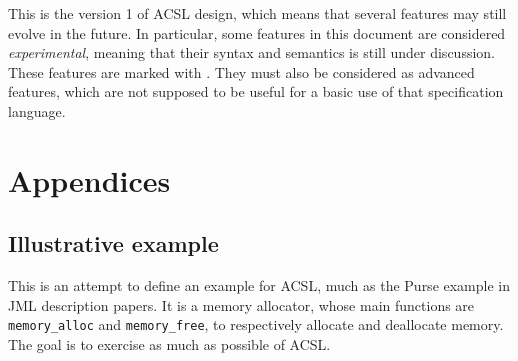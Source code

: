 \documentclass[a4paper,11pt,twoside,openright]{report}
\begin{document}
This is the version 1 of ACSL design, which means that several
features may still evolve in the future. In particular, some features
in this document are considered \emph{experimental}, meaning that
their syntax and semantics is still under discussion.  These features
are marked with \experimental.
They must also be considered as advanced features, which are not
supposed to be useful for a basic use of that specification language.









\appendix

\chapter{Appendices}
\label{chap:appendix}







\section{Illustrative example}

This is an attempt to define an example for ACSL, much as the Purse
example in JML description papers.  It is a memory allocator, whose
main functions are \verb|memory_alloc| and \verb|memory_free|, to respectively
allocate and deallocate memory.  The goal is to exercise as much as
possible of ACSL.



\cleardoublepage
{}


\cleardoublepage
{}
\listoffigures

\cleardoublepage
{}
\printindex
\end{document}
